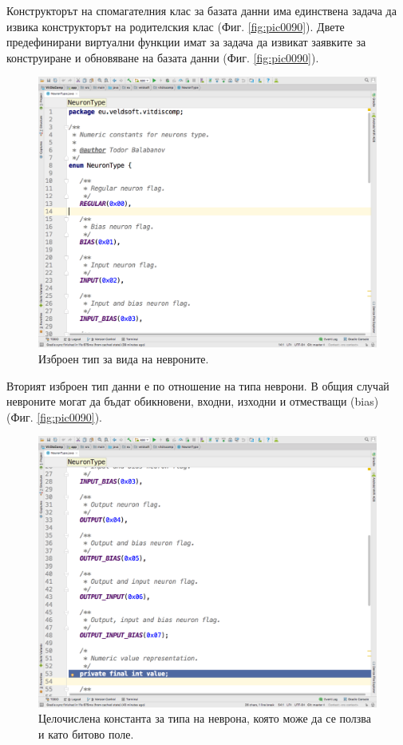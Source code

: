 \documentclass[book,14pt,oneside,openany]{memoir}
\begin{document}
Конструкторът на спомагателния клас за базата данни има единствена задача да извика конструкторът на родителския клас (Фиг. \ref{fig:pic0090}). Двете предефинирани виртуални функции имат за задача да извикат заявките за конструиране и обновяване на базата данни (Фиг. \ref{fig:pic0090}). 

\begin{figure}[h]
  \centering
  \includegraphics[height=0.45\pdfpageheight]{pic0091}
  \caption{Изброен тип за вида на невроните.}
\label{fig:pic0091}
\end{figure}
\FloatBarrier

Вторият изброен тип данни е по отношение на типа неврони. В общия случай невроните могат да бъдат обикновени, входни, изходни и отместващи (bias) (Фиг. \ref{fig:pic0090}).

\begin{figure}[h]
  \centering
  \includegraphics[height=0.45\pdfpageheight]{pic0092}
  \caption{Целочислена константа за типа на неврона, която може да се ползва и като битово поле.}
\label{fig:pic0092}
\end{figure}
\FloatBarrier
\end{document}

